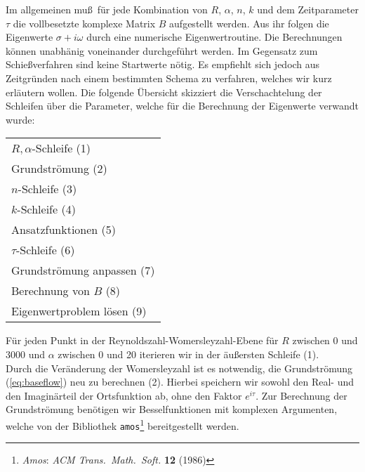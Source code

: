 \documentclass[10pt,a5paper,oneside,draft]{book}
\numberwithin{equation}{chapter}
\begin{document}
Im allgemeinen mu\ss\ f\"ur jede Kombination von $R$, $\alpha$, $n$, $k$ und dem Zeitparameter $\tau$ die vollbesetzte komplexe Matrix $B$ aufgestellt werden.
Aus ihr folgen die Eigenwerte $\sigma+i\omega$ durch eine numerische Eigenwertroutine.
Die Berechnungen k\"onnen unabh\"anig voneinander durchgef\"uhrt werden.
Im Gegensatz zum Schie\ss verfahren sind keine Startwerte n\"otig.
Es empfiehlt sich jedoch aus Zeitgr\"unden nach einem bestimmten Schema zu verfahren, welches wir kurz erl\"autern wollen.
Die folgende \"Ubersicht skizziert die Verschachtelung der Schleifen \"uber die Parameter, welche f\"ur die Berechnung der Eigenwerte verwandt wurde:
\begin{center}
\begin{tabular}{l}
	$R,\alpha$-Schleife (1)\\
		\hspace*{3em}Grundstr\"omung (2)\\
		\hspace*{3em}$n$-Schleife (3)\\
			\hspace*{6em}$k$-Schleife (4)\\
				\hspace*{9em}Ansatzfunktionen (5)\\
				\hspace*{9em}$\tau$-Schleife (6)\\
					\hspace*{12em}Grundstr\"omung anpassen (7)\\
					\hspace*{12em}Berechnung von $B$ (8)\\
					\hspace*{12em}Eigenwertproblem l\"osen (9)\\
\end{tabular}
\end{center}
F\"ur jeden Punkt in der Reynoldszahl-Womersleyzahl-Ebene f\"ur $R$ zwischen 0 und 3000 und $\alpha$ zwischen 0 und 20 iterieren wir in der \"au\ss ersten Schleife (1).\\
Durch die Ver\"anderung der Womersleyzahl ist es notwendig, die Grundstr\"omung (\mbox{\ref{eq:baseflow}}) neu zu berechnen (2).
Hierbei speichern wir sowohl den Real- und den Imagin\"arteil der Ortsfunktion ab, ohne den Faktor $e^{i\tau}$.
Zur Berechnung der Grundstr\"omung ben\"otigen wir Besselfunktionen mit komplexen Argumenten, welche von der Bibliothek \texttt{amos}\footnote{\label{bib:amos}\textsl{Amos}: \textit{ACM Trans.\ Math.\ Soft.} \textbf{12} (1986)}
bereitgestellt werden.\\
\end{document}
